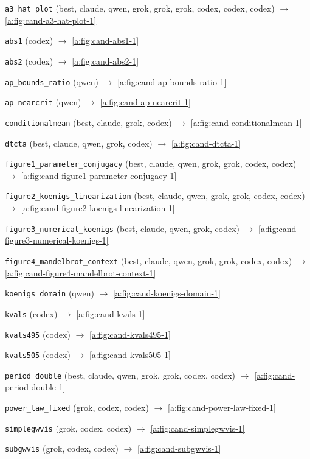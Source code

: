 \begingroup\footnotesize\raggedright
\setlength{\parskip}{1.5pt}\setlength{\parindent}{0pt}
\texttt{a3\_hat\_plot}  (best, claude, qwen, grok, grok, grok, codex, codex, codex) \quad $\rightarrow$ \cref{a:fig:cand-a3-hat-plot-1}\par
\texttt{abs1}  (codex) \quad $\rightarrow$ \cref{a:fig:cand-abs1-1}\par
\texttt{abs2}  (codex) \quad $\rightarrow$ \cref{a:fig:cand-abs2-1}\par
\texttt{ap\_bounds\_ratio}  (qwen) \quad $\rightarrow$ \cref{a:fig:cand-ap-bounds-ratio-1}\par
\texttt{ap\_nearcrit}  (qwen) \quad $\rightarrow$ \cref{a:fig:cand-ap-nearcrit-1}\par
\texttt{conditionalmean}  (best, claude, grok, codex) \quad $\rightarrow$ \cref{a:fig:cand-conditionalmean-1}\par
\texttt{dtcta}  (best, claude, qwen, grok, codex) \quad $\rightarrow$ \cref{a:fig:cand-dtcta-1}\par
\texttt{figure1\_parameter\_conjugacy}  (best, claude, qwen, grok, grok, codex, codex) \quad $\rightarrow$ \cref{a:fig:cand-figure1-parameter-conjugacy-1}\par
\texttt{figure2\_koenigs\_linearization}  (best, claude, qwen, grok, grok, codex, codex) \quad $\rightarrow$ \cref{a:fig:cand-figure2-koenigs-linearization-1}\par
\texttt{figure3\_numerical\_koenigs}  (best, claude, qwen, grok, codex) \quad $\rightarrow$ \cref{a:fig:cand-figure3-numerical-koenigs-1}\par
\texttt{figure4\_mandelbrot\_context}  (best, claude, qwen, grok, grok, codex, codex) \quad $\rightarrow$ \cref{a:fig:cand-figure4-mandelbrot-context-1}\par
\texttt{koenigs\_domain}  (qwen) \quad $\rightarrow$ \cref{a:fig:cand-koenigs-domain-1}\par
\texttt{kvals}  (codex) \quad $\rightarrow$ \cref{a:fig:cand-kvals-1}\par
\texttt{kvals495}  (codex) \quad $\rightarrow$ \cref{a:fig:cand-kvals495-1}\par
\texttt{kvals505}  (codex) \quad $\rightarrow$ \cref{a:fig:cand-kvals505-1}\par
\texttt{period\_double}  (best, claude, qwen, grok, grok, codex, codex) \quad $\rightarrow$ \cref{a:fig:cand-period-double-1}\par
\texttt{power\_law\_fixed}  (grok, codex, codex) \quad $\rightarrow$ \cref{a:fig:cand-power-law-fixed-1}\par
\texttt{simplegwvis}  (grok, codex, codex) \quad $\rightarrow$ \cref{a:fig:cand-simplegwvis-1}\par
\texttt{subgwvis}  (grok, codex, codex) \quad $\rightarrow$ \cref{a:fig:cand-subgwvis-1}\par
\endgroup

